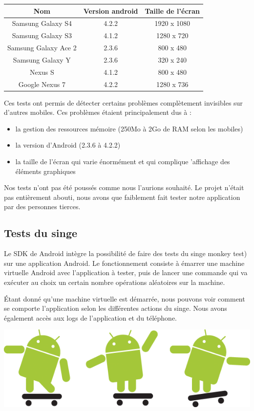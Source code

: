 \documentclass{report}
\begin{document}
\begin{center}
\begin{tabular}{|c|c|c|}
\hline
{\bf Nom} & {\bf Version android} & {\bf Taille de l'écran}\\
\hline
Samsung Galaxy S4 & 4.2.2 & 1920 x 1080\\
\hline
Samsung Galaxy S3 & 4.1.2 & 1280 x 720\\
\hline
Samsung Galaxy Ace 2 & 2.3.6 & 800 x 480\\
\hline
Samsung Galaxy Y & 2.3.6 & 320 x 240\\
\hline
Nexus S & 4.1.2 & 800 x 480\\
\hline
Google Nexus 7 & 4.2.2 & 1280 x 736\\
\hline
\end{tabular}
\end{center}
Ces tests ont permis de détecter certains problèmes complètement
invisibles sur d’autres mobiles. Ces problèmes étaient principalement
dus à :
\bigskip
\begin{itemize}
\item la gestion des ressources mémoire (250Mo à 2Go de RAM selon
les mobiles)
\item la version d’Android (2.3.6 à 4.2.2)
\item la taille de l’écran qui varie énormément et qui complique
’affichage des éléments graphiques
\end{itemize}
\bigskip

Nos tests n’ont pas été poussés comme nous l’aurions souhaité. Le
projet n’était pas entièrement abouti, nous avons que faiblement fait
tester notre application par des personnes tierces.

\subsection{Tests du singe}
\bigskip


Le SDK de Android intègre la possibilité de faire des tests du singe
monkey test) sur une application Android. Le fonctionnement consiste à
émarrer une machine virtuelle Android avec l’application à tester, puis
de lancer une commande qui va exécuter au choix un certain nombre
opérations aléatoires sur la machine.

Étant donné qu’une machine virtuelle est démarrée, nous pouvons voir
comment se comporte l’application selon les différentes actions du
singe. Nous avons également accès aux logs de l’application et du
téléphone.

\begin{center}
\includegraphics[scale=0.8]{images/monkey}
\end{center}
\end{document}
